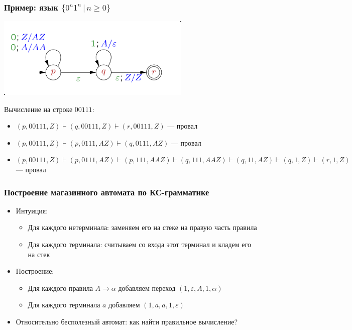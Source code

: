 \documentclass{beamer}
\begin{document}
\begin{frame}[fragile]
  \transwipe[direction=90]
  \frametitle{Пример: язык $\{ 0^n 1^n \, | \, n \geq 0 \}$}
\begin{center}
  \includegraphics[width=0.7\textwidth]{pics/Pda-example.png}
\end{center}

Вычисление на строке $00111$:
\begin{itemize}
  \item $(p, 00111, Z) \vdash (q, 00111, Z) \vdash (r, 00111, Z)$ --- провал
  \item $(p, 00111, Z) \vdash (p, 0111, AZ) \vdash (q, 0111, AZ)$ --- провал
  \item $(p, 00111, Z) \vdash (p, 0111, AZ) \vdash (p, 111, AAZ) \vdash (q, 111, AAZ) \vdash (q, 11, AZ) \vdash (q, 1, Z) \vdash (r, 1, Z)$ --- провал
\end{itemize}

\end{frame}


\begin{frame}[fragile]
  \transwipe[direction=90]
  \frametitle{Построение магазинного автомата по КС-грамматике}
  \begin{itemize}
    \item Интуиция:
    \begin{itemize}
      \item Для каждого нетерминала: заменяем его на стеке на правую часть правила
      \item Для каждого терминала: считываем со входа этот терминал и кладем его на стек
    \end{itemize}
    \item Построение:
    \begin{itemize}
      \item Для каждого правила $A \rightarrow \alpha$ добавляем переход $(1, \varepsilon, A, 1, \alpha)$
      \item Для каждого терминала $a$ добавляем $(1,a,a,1,\varepsilon)$
    \end{itemize}
    \item Относительно бесполезный автомат: как найти правильное вычисление?
  \end{itemize}
\end{frame}
\end{document}
